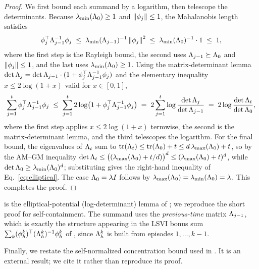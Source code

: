 \begin{proof}
We first bound each summand by a logarithm, then telescope the determinants.
Because $\lambda_{\min}(\Lambda_0)\ge1$ and $\left\| \phi_j \right\|\le1$, the
Mahalanobis length satisfies
\begin{align*}
\phi_j^\top \Lambda_{j-1}^{-1}\phi_j
\;\le\; \lambda_{\min}(\Lambda_{j-1})^{-1}\left\| \phi_j \right\|^2
\;\le\; \lambda_{\min}(\Lambda_0)^{-1}\cdot 1
\;\le\; 1,
\end{align*}
where the first step is the Rayleigh bound, the second uses $\Lambda_{j-1}
\succeq\Lambda_0$ and $\left\| \phi_j \right\|\le1$, and the last uses $\lambda_{\min}
(\Lambda_0)\ge1$. Using the matrix-determinant lemma $\det\Lambda_j=\det\Lambda_{j-1}
\cdot(1+\phi_j^\top\Lambda_{j-1}^{-1}\phi_j)$ and the elementary
inequality $x\le 2\log(1+x)$ valid for $x\in[0,1]$,
\begin{align*}
\sum_{j=1}^t \phi_j^\top \Lambda_{j-1}^{-1}\phi_j
\;\le\; \sum_{j=1}^t 2\log\!\big( 1 + \phi_j^\top \Lambda_{j-1}^{-1}\phi_j \big)
\;=\; 2\sum_{j=1}^t \log\frac{\det\Lambda_j}{\det\Lambda_{j-1}}
\;=\; 2\log\frac{\det\Lambda_t}{\det\Lambda_0},
\end{align*}
where the first step applies $x\le2\log(1+x)$ termwise, the second is the
matrix-determinant lemma, and the third telescopes the logarithm. For the final
bound, the eigenvalues of $\Lambda_t$ sum to $\mathrm{tr}(\Lambda_t)\le\mathrm{tr}
(\Lambda_0)+t\le d\,\lambda_{\max}(\Lambda_0)+t$, so by the AM--GM inequality
$\det\Lambda_t\le\big((\lambda_{\max}(\Lambda_0)+t/d)\big)^d\le(\lambda_{\max}
(\Lambda_0)+t)^d$, while $\det\Lambda_0\ge\lambda_{\min}(\Lambda_0)^d$; substituting
gives the right-hand inequality of Eq.~\eqref{eq:elliptical}. The case
$\Lambda_0=\lambda I$ follows by $\lambda_{\max}(\Lambda_0)=\lambda_{\min}(\Lambda_0)=
\lambda$. This completes the proof.
\end{proof}

\begin{remark}\label{rem:elliptical-source}
 is the elliptical-potential (log-determinant) lemma of
\cite{abbasi2011improved}; we reproduce the short proof for self-containment.
The summand uses the \emph{previous-time} matrix $\Lambda_{j-1}$, which is exactly
the structure appearing in the LSVI bonus sum $\sum_k(\phi_h^k)^\top
(\Lambda_h^k)^{-1}\phi_h^k$ of , since $\Lambda_h^k$ is built from
episodes $1,\dots,k-1$.
\end{remark}

Finally, we restate the self-normalized concentration bound used in
. It is an external result; we cite it rather than
reproduce its proof.

